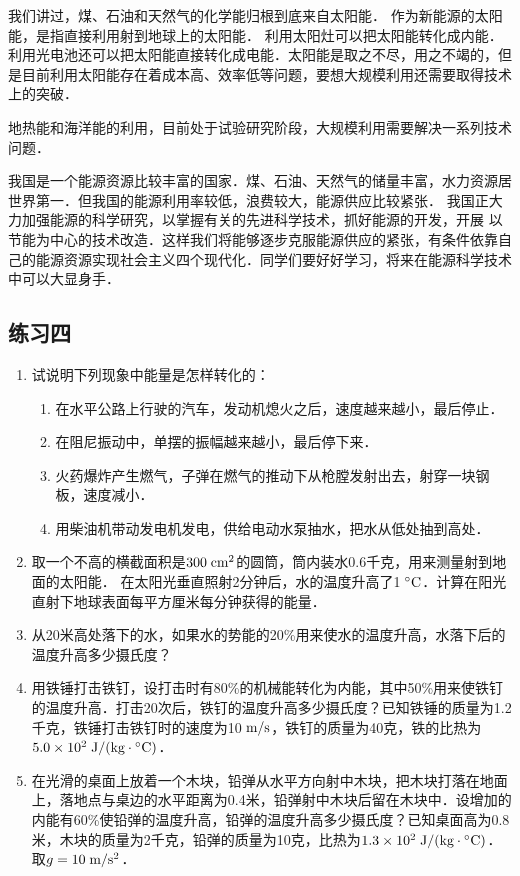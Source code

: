 我们讲过，煤、石油和天然气的化学能归根到底来自太阳能．
作为新能源的太阳能，是指直接利用射到地球上的太阳能．
利用太阳灶可以把太阳能转化成内能．利用光电池还可以把太阳能直接转化成电能．太阳能是取之不尽，用之不竭的，但是目前利用太阳能存在着成本高、效率低等问题，要想大规模利用还需要取得技术上的突破．

地热能和海洋能的利用，目前处于试验研究阶段，大规模利用需要解决一系列技术问题．

我国是一个能源资源比较丰富的国家．煤、石油、天然气的储量丰富，水力资源居世界第一．但我国的能源利用率较低，浪费较大，能源供应比较紧张．
我国正大力加强能源的科学研究，以掌握有关的先进科学技术，抓好能源的开发，开展
以节能为中心的技术改造．这样我们将能够逐步克服能源供应的紧张，有条件依靠自己的能源资源实现社会主义四个现代化．同学们要好好学习，将来在能源科学技术中可以大显身手．

\subsection*{练习四}

\begin{enumerate}
\item 试说明下列现象中能量是怎样转化的：
\begin{enumerate}
    \item 在水平公路上行驶的汽车，发动机熄火之后，速度越来越小，最后停止．
    \item 在阻尼振动中，单摆的振幅越来越小，最后停下来．
    \item 火药爆炸产生燃气，子弹在燃气的推动下从枪膛发射出去，射穿一块钢板，速度减小．
    \item 用柴油机带动发电机发电，供给电动水泵抽水，把水从低处抽到高处．
\end{enumerate}

\item 取一个不高的横截面积是$ 300 \;\text{cm}^2 $的圆筒，筒内装水0.6千克，用来测量射到地面的太阳能．
在太阳光垂直照射2分钟后，水的温度升高了1$\;{}^\circ\text{C}$．计算在阳光直射下地球表面每平方厘米每分钟获得的能量．
\item 从20米高处落下的水，如果水的势能的20\%用来使水的温度升高，水落下后的温度升高多少摄氏度？
\item 用铁锤打击铁钉，设打击时有80\%的机械能转化为内能，其中50\%用来使铁钉的温度升高．打击20次后，铁钉的温度升高多少摄氏度？已知铁锤的质量为1.2千克，铁锤打击铁钉时的速度为10$\;\text{m}/\text{s}$，铁钉的质量为40克，铁的比热为$5.0\times 10^2  \;\text{J}/(\text{kg}\cdot{}^\circ\text{C}) $．

\item 在光滑的桌面上放着一个木块，铅弹从水平方向射中木块，把木块打落在地面上，落地点与桌边的水平距离为0.4米，铅弹射中木块后留在木块中．设增加的内能有60\%使铅弹的温度升高，铅弹的温度升高多少摄氏度？已知桌面高为0.8米，木块的质量为2千克，铅弹的质量为10克，比热为$1.3\times 10^2 \;\text{J}/(\text{kg}\cdot{}^\circ\text{C}) $．取$g=10 \;\text{m}/\text{s}^2 $．

\end{enumerate}

